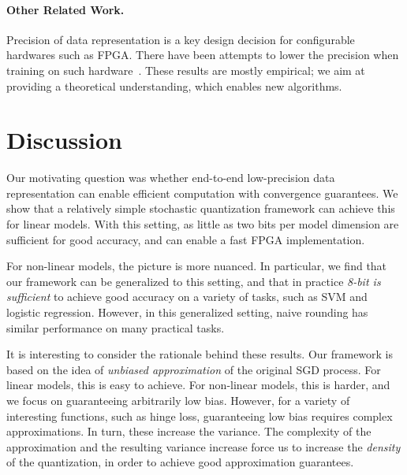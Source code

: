 \documentclass{article}
\begin{document}
\vspace{-1.2em}
\paragraph{Other Related Work.} Precision of data
representation is a key design decision
for configurable hardwares such as FPGA. There have been attempts to
lower the precision when training on such hardware~\cite{Kim:2011:ICASSP}. 
These results are mostly empirical; we
aim at providing a theoretical understanding, which 
enables new algorithms.

\vspace{-1.5em}
\section{Discussion}
\label{sec:conclusions}

\vspace{-1em}
Our motivating question was whether end-to-end low-precision data representation can enable efficient computation with convergence guarantees. 
We show that a relatively simple stochastic quantization framework can achieve this for linear models. 
With this setting, as little as two bits per model dimension are sufficient for good accuracy, and can enable a fast FPGA implementation.  

\vspace{-0.5em}
For non-linear models, the picture is more nuanced. 
In particular, we find that our framework can be generalized to this setting, and that in practice \emph{8-bit is sufficient} to achieve good accuracy on a variety of tasks, such as SVM and logistic regression. 
However, in this generalized setting, naive rounding has similar performance on many practical tasks. 

\vspace{-0.5em}
It is interesting to consider the rationale behind these results. Our framework is based on the idea of \emph{unbiased approximation} of the original SGD process. For linear models, this is easy to achieve. For non-linear models, this is harder, and we  focus on guaranteeing arbitrarily low bias. 
However, for a variety of interesting functions, such as hinge loss, guaranteeing low bias requires complex approximations. In turn, these increase the variance. The complexity of the approximation and the resulting variance increase force us to increase the \emph{density} of the quantization, in order to achieve good approximation guarantees. 


\cleardoublepage







\end{document}
